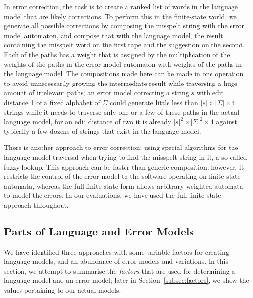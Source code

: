 \documentclass[a4paper,12pt]{article}
\begin{document}
In error correction, the task is to create a ranked list of words in the
language model that are likely corrections. To perform this in the finite-state
world, we generate all possible corrections by composing the misspelt string
with the error model automaton, and compose that with the language model, the
result containing the misspelt word on the first tape and the suggestion on the
second. Each of the paths has  a weight that is assigned by the multiplication
of the weights of the paths in the error model automaton with weights of the
paths in the language model. The compositions made here can be made in one
operation~\cite[]{hfst/2012/cla} to avoid unnecessarily growing the
intermediate result while traversing a huge amount of irrelevant paths; an
error model correcting a string $s$ with edit distance 1 of a fixed alphabet of
$\Sigma$ could generate little less than $|s| \times |\Sigma| \times 4$ strings
while it needs to traverse only one or a few of these paths in the actual
language model, for an edit distance of two it is already $|s|^2 \times
|\Sigma|^2 \times 4$ against typically a few dozens of strings that exist in
the language model.

There is another approach to error correction: using special algorithms
for the language model traversal when trying to find the misspelt string in it,
a so-called fuzzy lookup. This approach can be faster than generic
composition; however, it restricts the control of the error model to the
software operating on finite-state automata, whereas the full finite-state form
allows arbitrary weighted automata to model the errors. In our evaluations, we
have used the full finite-state approach throughout.

\subsection{Parts of Language and Error Models}
\label{subsec:summary}

We have identified three approaches with some variable factors for creating
language models, and an abundance of error models and variations. In this
section, we attempt to summarise the \emph{factors} that are used for
determining a language model and an error model; later in
Section~\ref{subsec:factors}, we show the values pertaining to our actual
models.
\end{document}
